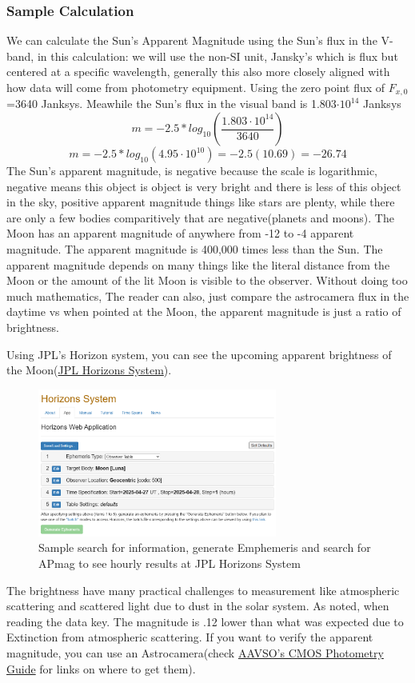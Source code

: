 \documentclass[12pt,oneside,a4paper,english]{article}
\begin{document}
\subsubsection{Sample Calculation}
We can calculate the Sun's Apparent Magnitude using the Sun's flux in the V-band, in this calculation: we will use the non-SI unit, Jansky's which is flux but centered at a specific wavelength, generally this also more closely aligned with how data will come from photometry equipment. Using the zero point flux of $F_{x,0}$=3640 Janksys.\cite{metrics} Meawhile the Sun's flux in the visual band is 1.803$\cdot10^{14}$ Janksys
\begin{equation}
    m = -2.5 *log_{10}(\frac{1.803\cdot10^{14}}{3640})
\end{equation}
\begin{equation}
    m = -2.5 *log_{10}(4.95\cdot10^{10}) = -2.5(10.69) = -26.74
\end{equation}
The Sun's apparent magnitude, is negative because the scale is logarithmic, negative means this object is object is very bright and there is less of this object in the sky, positive apparent magnitude things like stars are plenty, while there are only a few bodies comparitively that are negative(planets and moons). The Moon has an apparent magnitude of anywhere from -12 to -4 apparent magnitude. The apparent magnitude is 400,000 times less than the Sun. The apparent magnitude depends on many things like the literal distance from the Moon or the amount of the lit Moon is visible to the observer. Without doing too much mathematics, The reader can also, just compare the astrocamera flux in the daytime vs when pointed at the Moon, the apparent magnitude is just a ratio of brightness.

Using JPL's Horizon system, you can see the upcoming apparent brightness of the Moon(\href{https://ssd.jpl.nasa.gov/horizons/app.html#/}{JPL Horizons System}).
\begin{figure}[H]
    \centering
    \includegraphics[width=0.7\textwidth]{HorizonJPL.png}
    \caption{Sample search for information, generate Emphemeris and search for APmag to see hourly results at JPL Horizons System}
\end{figure} 
The brightness have many practical challenges to measurement like atmospheric scattering and scattered light due to dust in the solar system. As noted, when reading the data key. The magnitude is .12 lower than what was expected due to Extinction from atmospheric scattering. If you want to verify the apparent magnitude, you can use an Astrocamera(check \href{https://www.aavso.org/ccd-camera-photometry-guide}{AAVSO's CMOS Photometry Guide} for links on where to get them).
\end{document}
